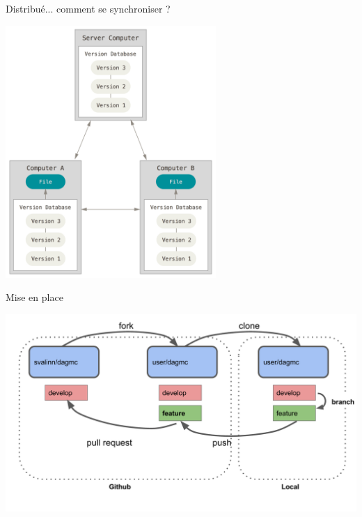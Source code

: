 \documentclass{beamer}
\begin{document}
\begin{frame}{Distribué... comment se synchroniser ?}
    \begin{center}
        \includegraphics[width=0.6\textwidth]{img/distributed.png}
    \end{center}
\end{frame}

\begin{frame}{Mise en place}
    \begin{center}
        \includegraphics[width=\textwidth]{img/github-setup.png}
    \end{center}
\end{frame}
\end{document}
